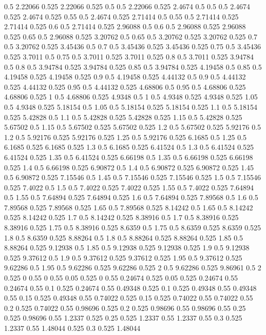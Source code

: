 0.5 2.22066
0.525 2.22066
0.525 0.5
0.5 2.22066
0.525 2.4674
0.5 0.5
0.5 2.4674
0.525 2.4674
0.525 0.55
0.5 2.4674
0.525 2.71414
0.5 0.55
0.5 2.71414
0.525 2.71414
0.525 0.6
0.5 2.71414
0.525 2.96088
0.5 0.6
0.5 2.96088
0.525 2.96088
0.525 0.65
0.5 2.96088
0.525 3.20762
0.5 0.65
0.5 3.20762
0.525 3.20762
0.525 0.7
0.5 3.20762
0.525 3.45436
0.5 0.7
0.5 3.45436
0.525 3.45436
0.525 0.75
0.5 3.45436
0.525 3.7011
0.5 0.75
0.5 3.7011
0.525 3.7011
0.525 0.8
0.5 3.7011
0.525 3.94784
0.5 0.8
0.5 3.94784
0.525 3.94784
0.525 0.85
0.5 3.94784
0.525 4.19458
0.5 0.85
0.5 4.19458
0.525 4.19458
0.525 0.9
0.5 4.19458
0.525 4.44132
0.5 0.9
0.5 4.44132
0.525 4.44132
0.525 0.95
0.5 4.44132
0.525 4.68806
0.5 0.95
0.5 4.68806
0.525 4.68806
0.525 1
0.5 4.68806
0.525 4.9348
0.5 1
0.5 4.9348
0.525 4.9348
0.525 1.05
0.5 4.9348
0.525 5.18154
0.5 1.05
0.5 5.18154
0.525 5.18154
0.525 1.1
0.5 5.18154
0.525 5.42828
0.5 1.1
0.5 5.42828
0.525 5.42828
0.525 1.15
0.5 5.42828
0.525 5.67502
0.5 1.15
0.5 5.67502
0.525 5.67502
0.525 1.2
0.5 5.67502
0.525 5.92176
0.5 1.2
0.5 5.92176
0.525 5.92176
0.525 1.25
0.5 5.92176
0.525 6.1685
0.5 1.25
0.5 6.1685
0.525 6.1685
0.525 1.3
0.5 6.1685
0.525 6.41524
0.5 1.3
0.5 6.41524
0.525 6.41524
0.525 1.35
0.5 6.41524
0.525 6.66198
0.5 1.35
0.5 6.66198
0.525 6.66198
0.525 1.4
0.5 6.66198
0.525 6.90872
0.5 1.4
0.5 6.90872
0.525 6.90872
0.525 1.45
0.5 6.90872
0.525 7.15546
0.5 1.45
0.5 7.15546
0.525 7.15546
0.525 1.5
0.5 7.15546
0.525 7.4022
0.5 1.5
0.5 7.4022
0.525 7.4022
0.525 1.55
0.5 7.4022
0.525 7.64894
0.5 1.55
0.5 7.64894
0.525 7.64894
0.525 1.6
0.5 7.64894
0.525 7.89568
0.5 1.6
0.5 7.89568
0.525 7.89568
0.525 1.65
0.5 7.89568
0.525 8.14242
0.5 1.65
0.5 8.14242
0.525 8.14242
0.525 1.7
0.5 8.14242
0.525 8.38916
0.5 1.7
0.5 8.38916
0.525 8.38916
0.525 1.75
0.5 8.38916
0.525 8.6359
0.5 1.75
0.5 8.6359
0.525 8.6359
0.525 1.8
0.5 8.6359
0.525 8.88264
0.5 1.8
0.5 8.88264
0.525 8.88264
0.525 1.85
0.5 8.88264
0.525 9.12938
0.5 1.85
0.5 9.12938
0.525 9.12938
0.525 1.9
0.5 9.12938
0.525 9.37612
0.5 1.9
0.5 9.37612
0.525 9.37612
0.525 1.95
0.5 9.37612
0.525 9.62286
0.5 1.95
0.5 9.62286
0.525 9.62286
0.525 2
0.5 9.62286
0.525 9.86961
0.5 2
0.525 0
0.55 0
0.55 0.05
0.525 0
0.55 0.24674
0.525 0.05
0.525 0.24674
0.55 0.24674
0.55 0.1
0.525 0.24674
0.55 0.49348
0.525 0.1
0.525 0.49348
0.55 0.49348
0.55 0.15
0.525 0.49348
0.55 0.74022
0.525 0.15
0.525 0.74022
0.55 0.74022
0.55 0.2
0.525 0.74022
0.55 0.98696
0.525 0.2
0.525 0.98696
0.55 0.98696
0.55 0.25
0.525 0.98696
0.55 1.2337
0.525 0.25
0.525 1.2337
0.55 1.2337
0.55 0.3
0.525 1.2337
0.55 1.48044
0.525 0.3
0.525 1.48044
